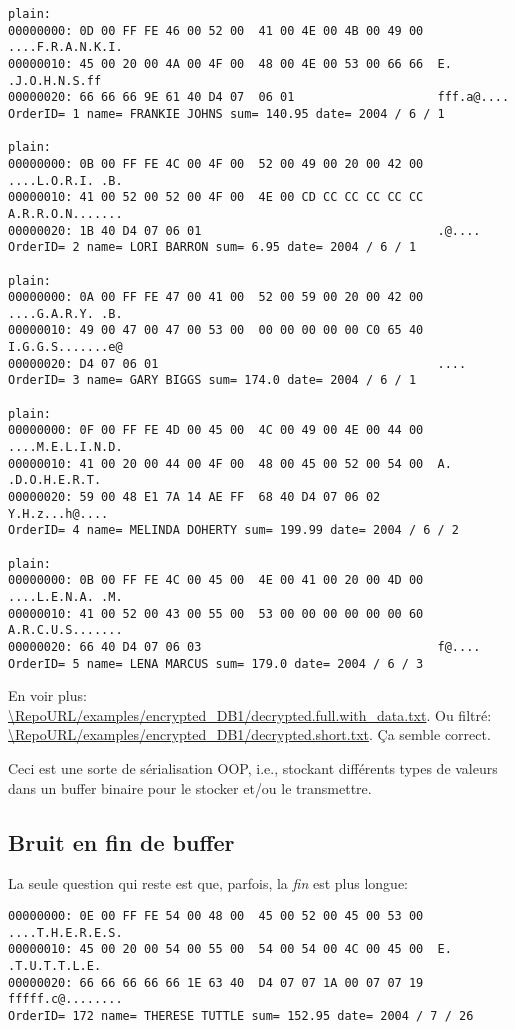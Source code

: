 \begin{lstlisting}
plain:
00000000: 0D 00 FF FE 46 00 52 00  41 00 4E 00 4B 00 49 00  ....F.R.A.N.K.I.
00000010: 45 00 20 00 4A 00 4F 00  48 00 4E 00 53 00 66 66  E. .J.O.H.N.S.ff
00000020: 66 66 66 9E 61 40 D4 07  06 01                    fff.a@....
OrderID= 1 name= FRANKIE JOHNS sum= 140.95 date= 2004 / 6 / 1

plain:
00000000: 0B 00 FF FE 4C 00 4F 00  52 00 49 00 20 00 42 00  ....L.O.R.I. .B.
00000010: 41 00 52 00 52 00 4F 00  4E 00 CD CC CC CC CC CC  A.R.R.O.N.......
00000020: 1B 40 D4 07 06 01                                 .@....
OrderID= 2 name= LORI BARRON sum= 6.95 date= 2004 / 6 / 1

plain:
00000000: 0A 00 FF FE 47 00 41 00  52 00 59 00 20 00 42 00  ....G.A.R.Y. .B.
00000010: 49 00 47 00 47 00 53 00  00 00 00 00 00 C0 65 40  I.G.G.S.......e@
00000020: D4 07 06 01                                       ....
OrderID= 3 name= GARY BIGGS sum= 174.0 date= 2004 / 6 / 1

plain:
00000000: 0F 00 FF FE 4D 00 45 00  4C 00 49 00 4E 00 44 00  ....M.E.L.I.N.D.
00000010: 41 00 20 00 44 00 4F 00  48 00 45 00 52 00 54 00  A. .D.O.H.E.R.T.
00000020: 59 00 48 E1 7A 14 AE FF  68 40 D4 07 06 02        Y.H.z...h@....
OrderID= 4 name= MELINDA DOHERTY sum= 199.99 date= 2004 / 6 / 2

plain:
00000000: 0B 00 FF FE 4C 00 45 00  4E 00 41 00 20 00 4D 00  ....L.E.N.A. .M.
00000010: 41 00 52 00 43 00 55 00  53 00 00 00 00 00 00 60  A.R.C.U.S.......
00000020: 66 40 D4 07 06 03                                 f@....
OrderID= 5 name= LENA MARCUS sum= 179.0 date= 2004 / 6 / 3
\end{lstlisting}

En voir plus: \url{\RepoURL/examples/encrypted_DB1/decrypted.full.with_data.txt}.
Ou filtré: \url{\RepoURL/examples/encrypted_DB1/decrypted.short.txt}.
Ça semble correct.

Ceci est une sorte de sérialisation \ac{OOP}, i.e., stockant différents types de
valeurs dans un buffer binaire pour le stocker et/ou le transmettre.

\subsection{Bruit en fin de buffer}

La seule question qui reste est que, parfois, la \emph{fin} est plus longue:

\begin{lstlisting}
00000000: 0E 00 FF FE 54 00 48 00  45 00 52 00 45 00 53 00  ....T.H.E.R.E.S.
00000010: 45 00 20 00 54 00 55 00  54 00 54 00 4C 00 45 00  E. .T.U.T.T.L.E.
00000020: 66 66 66 66 66 1E 63 40  D4 07 07 1A 00 07 07 19  fffff.c@........
OrderID= 172 name= THERESE TUTTLE sum= 152.95 date= 2004 / 7 / 26
\end{lstlisting}

